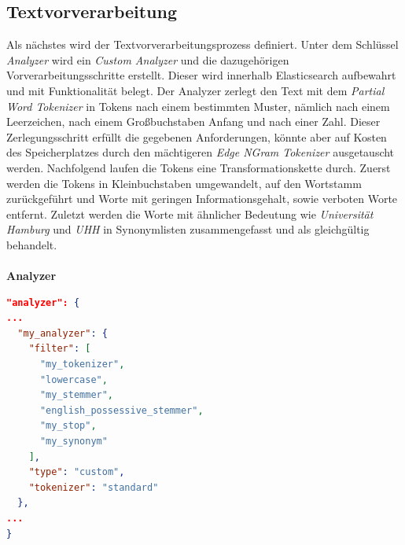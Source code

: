 \subsection{Textvorverarbeitung}
Als nächstes wird der Textvorverarbeitungsprozess definiert. Unter dem Schlüssel \textit{Analyzer} wird ein \textit{Custom Analyzer} und die dazugehörigen Vorverarbeitungsschritte erstellt. Dieser wird innerhalb Elasticsearch aufbewahrt und mit Funktionalität belegt. Der Analyzer zerlegt den Text mit dem \textit{Partial Word Tokenizer} in Tokens nach einem bestimmten Muster, nämlich nach einem Leerzeichen, nach einem Großbuchstaben Anfang und nach einer Zahl.
Dieser Zerlegungsschritt erfüllt die gegebenen Anforderungen, könnte aber auf Kosten des Speicherplatzes durch den mächtigeren \textit{Edge NGram Tokenizer} ausgetauscht werden. Nachfolgend laufen die Tokens eine Transformationskette durch. Zuerst werden die Tokens in Kleinbuchstaben umgewandelt, auf den Wortstamm zurückgeführt und Worte mit geringen Informationsgehalt, sowie verboten Worte entfernt. Zuletzt werden die Worte mit ähnlicher Bedeutung wie \textit{Universität Hamburg} und \textit{UHH} in Synonymlisten zusammengefasst und als gleichgültig behandelt. 
\\\\
\textbf{Analyzer}
\begin{lstlisting}[language=json,firstnumber=1]
"analyzer": {
...
  "my_analyzer": {
    "filter": [
      "my_tokenizer",
      "lowercase",
      "my_stemmer",
      "english_possessive_stemmer",
      "my_stop",
      "my_synonym"
    ],
    "type": "custom",
    "tokenizer": "standard"
  },
...
}
\end{lstlisting}

